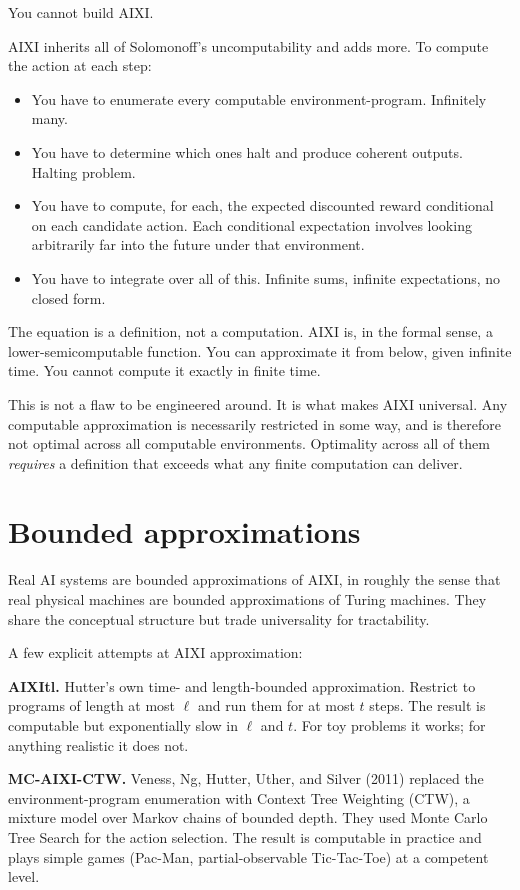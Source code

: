 You cannot build AIXI.

AIXI inherits all of Solomonoff's uncomputability and adds more. To compute the action at each step:

\begin{itemize}
\item You have to enumerate every computable environment-program. Infinitely many.
\item You have to determine which ones halt and produce coherent outputs. Halting problem.
\item You have to compute, for each, the expected discounted reward conditional on each candidate action. Each conditional expectation involves looking arbitrarily far into the future under that environment.
\item You have to integrate over all of this. Infinite sums, infinite expectations, no closed form.
\end{itemize}

The equation is a definition, not a computation. AIXI is, in the formal sense, a lower-semicomputable function. You can approximate it from below, given infinite time. You cannot compute it exactly in finite time.

This is not a flaw to be engineered around. It is what makes AIXI universal. Any computable approximation is necessarily restricted in some way, and is therefore not optimal across all computable environments. Optimality across all of them \emph{requires} a definition that exceeds what any finite computation can deliver.

\section*{Bounded approximations}

Real AI systems are bounded approximations of AIXI, in roughly the sense that real physical machines are bounded approximations of Turing machines. They share the conceptual structure but trade universality for tractability.

A few explicit attempts at AIXI approximation:

\textbf{AIXItl.} Hutter's own time- and length-bounded approximation. Restrict to programs of length at most $\ell$ and run them for at most $t$ steps. The result is computable but exponentially slow in $\ell$ and $t$. For toy problems it works; for anything realistic it does not.

\textbf{MC-AIXI-CTW.} Veness, Ng, Hutter, Uther, and Silver (2011) replaced the environment-program enumeration with Context Tree Weighting (CTW), a mixture model over Markov chains of bounded depth. They used Monte Carlo Tree Search for the action selection. The result is computable in practice and plays simple games (Pac-Man, partial-observable Tic-Tac-Toe) at a competent level.

